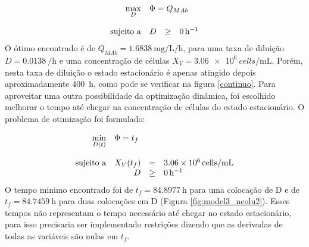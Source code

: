 \documentclass[fleqn,10pt]{SelfArx} %
\begin{document}
\begin{equation} \label{eq:otim2}
\begin{array}{rrclcl}
\displaystyle \max_{D} & \multicolumn{3}{l}{\Phi = Q_{MAb}} \\
& & & \\
\textrm{sujeito a} & D & \geq & \SI{0}{\per\hour} \\
\end{array}
\end{equation}
O ótimo encontrado é de $Q_{MAb} = \SI{1,6838}{\mg\per\liter\per\hour}$, para uma taxa de diluição $D = \SI{0.0138}{\per\hour}$ e uma concentração de células $X_V = \SI{3.06e6}{cells \per\mL}$. Porém, nesta taxa de diluição o estado estacionário é apenas atingido depois aproximadamente \SI{400}{\hour}, como pode se verificar na figura \ref{continuo}. Para aproveitar uma outra possibilidade da optimização dinâmica, foi escolhido melhorar o tempo até chegar na concentração de células do estado estacionário. O problema de otimização foi formulado:

\begin{equation} \label{eq:otim3}
\begin{array}{rrclcl}
\displaystyle \min_{D(t)} & \multicolumn{3}{l}{\Phi = t_{f}} \\
& & & \\
\textrm{sujeito a} & X_V(t_{f}) & = & \SI{3.06e6}{cells \per\mL} \\
& D & \geq & \SI{0}{\per\hour}\\
\end{array}
\end{equation}
O tempo minimo encontrado foi de $t_{f} = \SI{84,8977}{\hour}$ para uma colocação de D e de $t_{f} = \SI{84,7459}{\hour}$ para duas colocações em D (Figura \ref{fig:model3_ncolu2}). Esses tempos não representam o tempo necessário até chegar no estado estacionário, para isso precisaria ser implementado restrições dizendo que as derivadas de todas as variáveis são nulas em $t_{f}$.
\end{document}
